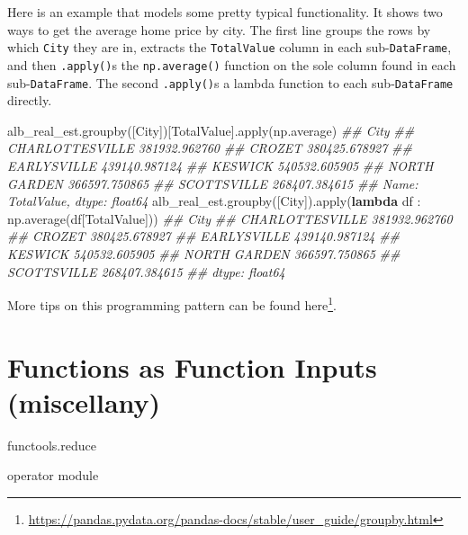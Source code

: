 \documentclass[
  12pt,
  krantz2]{krantz}
\makeatletter
\newenvironment{Shaded}{\begin{snugshade}}{\end{snugshade}}
\newcommand{\BuiltInTok}[1]{#1}
\newcommand{\CommentTok}[1]{\textcolor[rgb]{0.37,0.37,0.37}{\textit{#1}}}
\newcommand{\KeywordTok}[1]{\textcolor[rgb]{0.27,0.27,0.27}{\textbf{#1}}}
\newcommand{\NormalTok}[1]{#1}
\newcommand{\StringTok}[1]{\textcolor[rgb]{0.5,0.5,0.5}{#1}}
\renewcommand{\href}[2]{#2\footnote{\url{#1}}}
\newenvironment{kframe}{%
\medskip{}
\setlength{\fboxsep}{.8em}
 \def\at@end@of@kframe{}%
 \ifinner\ifhmode%
  \def\at@end@of@kframe{\end{minipage}}%
  \begin{minipage}{\columnwidth}%
 \fi\fi%
 \def\FrameCommand##1{\hskip\@totalleftmargin \hskip-\fboxsep
 \colorbox{shadecolor}{##1}\hskip-\fboxsep
     \hskip-\linewidth \hskip-\@totalleftmargin \hskip\columnwidth}%
 \MakeFramed {\advance\hsize-\width
   \@totalleftmargin\z@ \linewidth\hsize
   \@setminipage}}%
 {\par\unskip\endMakeFramed%
 \at@end@of@kframe}
\renewenvironment{Shaded}{\begin{kframe}}{\end{kframe}}
\makeatother
\begin{document}
Here is an example that models some pretty typical functionality. It shows two ways to get the average home price by city. The first line groups the rows by which \texttt{City} they are in, extracts the \texttt{TotalValue} column in each sub-\texttt{DataFrame}, and then \texttt{.apply()}s the \texttt{np.average()} function on the sole column found in each sub-\texttt{DataFrame}. The second \texttt{.apply()}s a lambda function to each sub-\texttt{DataFrame} directly.

\begin{Shaded}
\begin{Highlighting}[]
\NormalTok{alb\_real\_est.groupby([}\StringTok{\textquotesingle{}City\textquotesingle{}}\NormalTok{])[}\StringTok{\textquotesingle{}TotalValue\textquotesingle{}}\NormalTok{].}\BuiltInTok{apply}\NormalTok{(np.average)}
\CommentTok{\#\# City}
\CommentTok{\#\# CHARLOTTESVILLE    381932.962760}
\CommentTok{\#\# CROZET             380425.678927}
\CommentTok{\#\# EARLYSVILLE        439140.987124}
\CommentTok{\#\# KESWICK            540532.605905}
\CommentTok{\#\# NORTH GARDEN       366597.750865}
\CommentTok{\#\# SCOTTSVILLE        268407.384615}
\CommentTok{\#\# Name: TotalValue, dtype: float64}
\NormalTok{alb\_real\_est.groupby([}\StringTok{\textquotesingle{}City\textquotesingle{}}\NormalTok{]).}\BuiltInTok{apply}\NormalTok{(}\KeywordTok{lambda}\NormalTok{ df : np.average(df[}\StringTok{\textquotesingle{}TotalValue\textquotesingle{}}\NormalTok{]))}
\CommentTok{\#\# City}
\CommentTok{\#\# CHARLOTTESVILLE    381932.962760}
\CommentTok{\#\# CROZET             380425.678927}
\CommentTok{\#\# EARLYSVILLE        439140.987124}
\CommentTok{\#\# KESWICK            540532.605905}
\CommentTok{\#\# NORTH GARDEN       366597.750865}
\CommentTok{\#\# SCOTTSVILLE        268407.384615}
\CommentTok{\#\# dtype: float64}
\end{Highlighting}
\end{Shaded}

More tips on this programming pattern can be found \href{https://pandas.pydata.org/pandas-docs/stable/user_guide/groupby.html}{here}.

\hypertarget{functions-as-function-inputs-miscellany}{%
\section{Functions as Function Inputs (miscellany)}\label{functions-as-function-inputs-miscellany}}

functools.reduce

operator module
\end{document}

